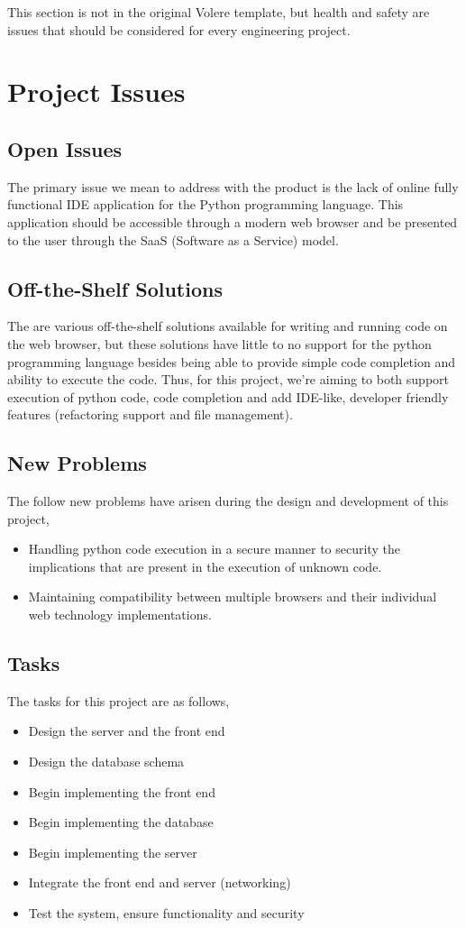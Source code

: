 \documentclass[12pt, titlepage]{article}
\begin{document}
	This section is not in the original Volere template, but health and safety
	are issues that should be considered for every engineering project.

\section{Project Issues}

  \subsection{Open Issues}
	The primary issue we mean to address with the product is the lack of online
	fully functional IDE application for the Python programming language. This
	application should be accessible through a modern web browser and be
	presented to the user through the SaaS (Software as a Service) model.

  \subsection{Off-the-Shelf Solutions}
  The are various off-the-shelf solutions available for writing and running
  code on the web browser, but these solutions have little to no support for
  the python programming language besides being able to provide simple code
  completion and ability to execute the code. Thus, for this project, we're
	aiming to both support execution of python code, code completion and add
	IDE-like, developer friendly features (refactoring support and file
	management).

  \subsection{New Problems}
	The follow new problems have arisen during the design and development of this
	project,
	\begin{itemize}
		\item Handling python code execution in a secure manner to security
            the implications that are present in the execution of unknown code.
		\item Maintaining compatibility between multiple browsers and their
			individual web technology implementations.
	\end{itemize}

  \subsection{Tasks}
	The tasks for this project are as follows,
	\begin{itemize}
		\item Design the server and the front end
		\item Design the database schema
		\item Begin implementing the front end
		\item Begin implementing the database
		\item Begin implementing the server
		\item Integrate the front end and server (networking)
		\item Test the system, ensure functionality and security
	\end{itemize}
\end{document}
